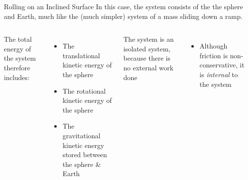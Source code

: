 \documentclass[12pt,compress,aspectratio=169]{beamer}
\begin{document}
\begin{frame}{Rolling on an Inclined Surface}
  In this case, the system consists of the the sphere and Earth, much like the
  (much simpler) system of a mass sliding down a ramp.

  \vspace{.2in}
  \begin{columns}

    The total energy of the system therefore includes:
    \begin{itemize}
    \item The translational kinetic energy of the sphere
    \item The rotational kinetic energy of the sphere
    \item The gravitational kinetic energy stored between the sphere \& Earth
    \end{itemize}
    The system is an isolated system, because there is no external work done
    \begin{itemize}
    \item Although friction is non-conservative, it is \emph{internal} to the
      system
    \end{itemize}
  \end{columns}
\end{frame}
\end{document}
